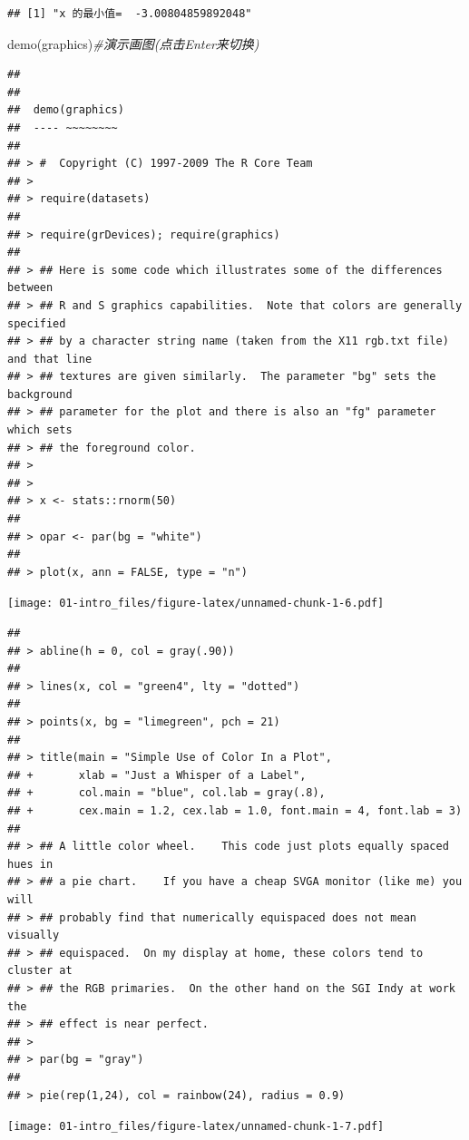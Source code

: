 \documentclass[
]{book}
\newenvironment{Shaded}{\begin{snugshade}}{\end{snugshade}}
\newcommand{\CommentTok}[1]{\textcolor[rgb]{0.56,0.35,0.01}{\textit{#1}}}
\newcommand{\FunctionTok}[1]{\textcolor[rgb]{0.00,0.00,0.00}{#1}}
\newcommand{\NormalTok}[1]{#1}
\begin{document}
\begin{verbatim}
## [1] "x 的最小值=  -3.00804859892048"
\end{verbatim}

\begin{Shaded}
\begin{Highlighting}[]
\FunctionTok{demo}\NormalTok{(graphics)}\CommentTok{\#演示画图(点击Enter来切换)}
\end{Highlighting}
\end{Shaded}

\begin{verbatim}
## 
## 
##  demo(graphics)
##  ---- ~~~~~~~~
## 
## > #  Copyright (C) 1997-2009 The R Core Team
## > 
## > require(datasets)
## 
## > require(grDevices); require(graphics)
## 
## > ## Here is some code which illustrates some of the differences between
## > ## R and S graphics capabilities.  Note that colors are generally specified
## > ## by a character string name (taken from the X11 rgb.txt file) and that line
## > ## textures are given similarly.  The parameter "bg" sets the background
## > ## parameter for the plot and there is also an "fg" parameter which sets
## > ## the foreground color.
## > 
## > 
## > x <- stats::rnorm(50)
## 
## > opar <- par(bg = "white")
## 
## > plot(x, ann = FALSE, type = "n")
\end{verbatim}

\texttt{[image: 01-intro\_files/figure-latex/unnamed-chunk-1-6.pdf]}

\begin{verbatim}
## 
## > abline(h = 0, col = gray(.90))
## 
## > lines(x, col = "green4", lty = "dotted")
## 
## > points(x, bg = "limegreen", pch = 21)
## 
## > title(main = "Simple Use of Color In a Plot",
## +       xlab = "Just a Whisper of a Label",
## +       col.main = "blue", col.lab = gray(.8),
## +       cex.main = 1.2, cex.lab = 1.0, font.main = 4, font.lab = 3)
## 
## > ## A little color wheel.    This code just plots equally spaced hues in
## > ## a pie chart.    If you have a cheap SVGA monitor (like me) you will
## > ## probably find that numerically equispaced does not mean visually
## > ## equispaced.  On my display at home, these colors tend to cluster at
## > ## the RGB primaries.  On the other hand on the SGI Indy at work the
## > ## effect is near perfect.
## > 
## > par(bg = "gray")
## 
## > pie(rep(1,24), col = rainbow(24), radius = 0.9)
\end{verbatim}

\texttt{[image: 01-intro\_files/figure-latex/unnamed-chunk-1-7.pdf]}
\end{document}
